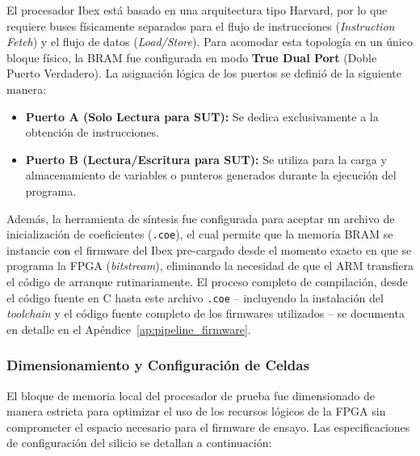 El procesador Ibex está basado en una arquitectura tipo Harvard, por lo que requiere buses físicamente separados para el flujo de instrucciones (\textit{Instruction Fetch}) y el flujo de datos (\textit{Load/Store}). Para acomodar esta topología en un único bloque físico, la BRAM fue configurada en modo \textbf{True Dual Port} (Doble Puerto Verdadero). La asignación lógica de los puertos se definió de la siguiente manera:
\begin{itemize}
    \item \textbf{Puerto A (Solo Lectura para SUT):} Se dedica exclusivamente a la obtención de instrucciones.
    \item \textbf{Puerto B (Lectura/Escritura para SUT):} Se utiliza para la carga y almacenamiento de variables o punteros generados durante la ejecución del programa.
\end{itemize}

Además, la herramienta de síntesis fue configurada para aceptar un archivo de inicialización de coeficientes (\texttt{.coe}), el cual permite que la memoria BRAM se instancie con el firmware del Ibex
    pre-cargado desde el momento exacto en que se programa la FPGA (\textit{bitstream}), eliminando la necesidad de que el ARM transfiera el código de arranque rutinariamente. El proceso completo
    de compilación, desde el código fuente en C hasta este archivo \texttt{.coe} -- incluyendo la instalación del \textit{toolchain} y el código fuente completo de los firmwares utilizados -- se
    documenta en detalle en el Apéndice~\ref{ap:pipeline_firmware}.

\subsubsection{Dimensionamiento y Configuración de Celdas}
\label{sssec:bram_dimensions}

El bloque de memoria local del procesador de prueba fue dimensionado de manera estricta para optimizar el uso de los recursos lógicos de la FPGA sin comprometer el espacio necesario para el firmware de ensayo. Las especificaciones de configuración del silicio se detallan a continuación:

